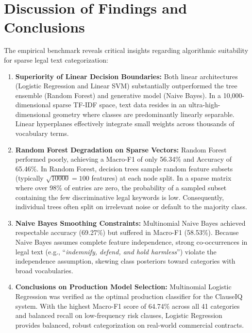 \section{Discussion of Findings and Conclusions}
\label{sec:discussion_of_findings}

The empirical benchmark reveals critical insights regarding algorithmic suitability for sparse legal text categorization:
\begin{enumerate}
    \item \textbf{Superiority of Linear Decision Boundaries:} Both linear architectures (Logistic Regression and Linear SVM) substantially outperformed the tree ensemble (Random Forest) and generative model (Naive Bayes). In a 10,000-dimensional sparse TF-IDF space, text data resides in an ultra-high-dimensional geometry where classes are predominantly linearly separable. Linear hyperplanes effectively integrate small weights across thousands of vocabulary terms.
    \item \textbf{Random Forest Degradation on Sparse Vectors:} Random Forest performed poorly, achieving a Macro-F1 of only 56.34\% and Accuracy of 65.46\%. In Random Forest, decision trees sample random feature subsets (typically $\sqrt{10000} = 100$ features) at each node split. In a sparse matrix where over 98\% of entries are zero, the probability of a sampled subset containing the few discriminative legal keywords is low. Consequently, individual trees often split on irrelevant noise or default to the majority class.
    \item \textbf{Naive Bayes Smoothing Constraints:} Multinomial Naive Bayes achieved respectable accuracy (69.27\%) but suffered in Macro-F1 (58.53\%). Because Naive Bayes assumes complete feature independence, strong co-occurrences in legal text (e.g., ``\textit{indemnify, defend, and hold harmless}'') violate the independence assumption, skewing class posteriors toward categories with broad vocabularies.
    \item \textbf{Conclusions on Production Model Selection:} Multinomial Logistic Regression was verified as the optimal production classifier for the ClauseIQ system. With the highest Macro-F1 score of 64.74\% across all 41 categories and balanced recall on low-frequency risk clauses, Logistic Regression provides balanced, robust categorization on real-world commercial contracts.
\end{enumerate}
